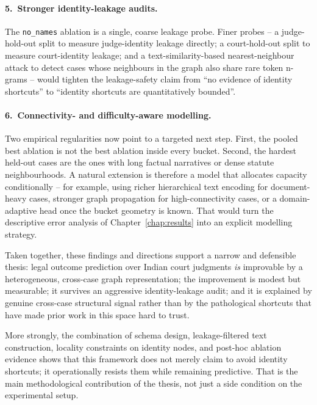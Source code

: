 \paragraph{5.\ Stronger identity-leakage audits.} The \texttt{no\_names}
ablation is a single, coarse leakage probe. Finer probes -- a
judge-hold-out split to measure judge-identity leakage directly; a
court-hold-out split to measure court-identity leakage; and a
text-similarity-based nearest-neighbour attack to detect cases whose
neighbours in the graph also share rare token n-grams -- would
tighten the leakage-safety claim from ``no evidence of identity
shortcuts'' to ``identity shortcuts are quantitatively bounded''.

{\color{blue}\paragraph{6.\ Connectivity- and difficulty-aware modelling.}
Two empirical regularities now point to a targeted next step. First,
the pooled best ablation is not the best ablation inside every bucket.
Second, the hardest held-out cases are the ones with long factual
narratives or dense statute neighbourhoods. A natural extension is
therefore a model that allocates capacity conditionally -- for example,
using richer hierarchical text encoding for document-heavy cases,
stronger graph propagation for high-connectivity cases, or a
domain-adaptive head once the bucket geometry is known. That would turn
the descriptive error analysis of Chapter~\ref{chap:results} into an
explicit modelling strategy.}

\medskip

Taken together, these findings and directions support a narrow and
defensible thesis: legal outcome prediction over Indian court
judgments \emph{is} improvable by a heterogeneous, cross-case graph
representation; the improvement is modest but measurable; it survives
an aggressive identity-leakage audit; and it is explained by genuine
cross-case structural signal rather than by the pathological
shortcuts that have made prior work in this space hard to trust.

{\color{blue}More strongly, the combination of schema design,
leakage-filtered text construction, locality constraints on identity
nodes, and post-hoc ablation evidence shows that this framework does
not merely claim to avoid identity shortcuts; it operationally resists
them while remaining predictive. That is the main methodological
contribution of the thesis, not just a side condition on the
experimental setup.}
